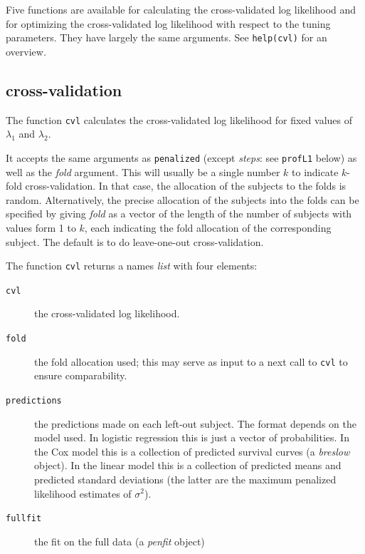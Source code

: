 \documentclass[a4paper]{article}
\newcommand{\Robject}[1]{{\texttt{#1}}}
\newcommand{\Rfunction}[1]{{\texttt{#1}}}
\newcommand{\Rclass}[1]{{\textit{#1}}}
\newcommand{\Rfunarg}[1]{{\textit{#1}}}
\begin{document}
Five functions are available for calculating the cross-validated log likelihood and for optimizing the cross-validated log likelihood with respect to the tuning parameters. They have largely the same arguments. See \Robject{help(cvl)} for an overview.


\subsection{cross-validation}

The function \Rfunction{cvl} calculates the cross-validated log likelihood for fixed values of $\lambda_1$ and $\lambda_2$.

It accepts the same arguments as \Rfunction{penalized} (except \Rfunarg{steps}: see \Rfunction{profL1} below) as well as the \Rfunarg{fold} argument. This will usually be a single number $k$ to indicate $k$-fold cross-validation. In that case, the allocation of the subjects to the folds is random. Alternatively, the precise allocation of the subjects into the folds can be specified by giving \Rfunarg{fold} as a vector of the length of the number of subjects with values form 1 to $k$, each indicating the fold allocation of the corresponding subject. The default is to do leave-one-out cross-validation.

The function \Rfunction{cvl} returns a names \Rclass{list} with four elements:
\begin{description}
\item[\Robject{cvl}] the cross-validated log likelihood.
\item[\Robject{fold}] the fold allocation used; this may serve as input to a next call to \Rfunction{cvl} to ensure comparability.
\item[\Robject{predictions}] the predictions made on each left-out subject. The format depends on the model used. In logistic regression this is just a vector of probabilities. In the Cox model this is a collection of predicted survival curves (a \Rclass{breslow} object). In the linear model this is a collection of predicted means and predicted standard deviations (the latter are the maximum penalized likelihood estimates of $\sigma^2$).
\item[\Robject{fullfit}] the fit on the full data (a \Rclass{penfit} object)
\end{description}
\end{document}

